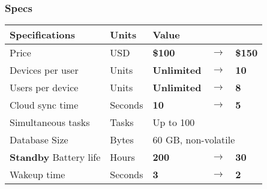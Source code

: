 \documentclass{beamer}
\begin{document}
\begin{frame}
  \frametitle{Specs}
  \centering
    \begin{tabular}{lllll}
    \hline
    Specifications                & Units   & \multicolumn{3}{l}{Value}                        \\
    \hline
    Price                         & USD     & \textbf{\$100}     & \textbf{$\rightarrow$} & \textbf{\$150} \\
    Devices per user              & Units   & \textbf{Unlimited} & \textbf{$\rightarrow$} & \textbf{10}    \\
    Users per device              & Units   & \textbf{Unlimited} & \textbf{$\rightarrow$} & \textbf{8}     \\
    Cloud sync time               & Seconds & \textbf{10}        & \textbf{$\rightarrow$} & \textbf{5}     \\
    Simultaneous tasks             & Tasks   & \multicolumn{3}{l}{Up to 100}                    \\
    Database Size                 & Bytes   & \multicolumn{3}{l}{60 GB, non-volatile}          \\
    \textbf{Standby} Battery life & Hours   & \textbf{200}       & \textbf{$\rightarrow$} & \textbf{30}    \\
    Wakeup time                   & Seconds & \textbf{3}         & \textbf{$\rightarrow$} & \textbf{2}    \\
    \hline
    \end{tabular}
\end{frame}
\end{document}
